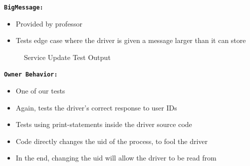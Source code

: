 \documentclass[11pt]{article}
\begin{document}
\begin{adjustwidth}{.2in}{}
{      \newpage

      {\tt \bf BigMessage: }

         \vspace{-5mm}
         \begin{itemize} 
         
            \item Provided by professor

            \item Tests edge case where the driver is given a message larger
            than it can store

         \end{itemize}

      \begin{figure}[H]
         \centering
         \caption{Service Update Test Output}
         \label{fig:latex}
      \end{figure}


      {\tt \bf Owner Behavior: }

         \vspace{-5mm}
         \begin{itemize} 
         
            \item One of our tests

            \item Again, tests the driver's correct response to user IDs 

            \item Tests using print-statements inside the driver source code

            \item Code directly changes the uid of the process, to fool the driver

            \item In the end, changing the uid will allow the driver to be read from

         \end{itemize}

}
\end{adjustwidth}
\end{document}
